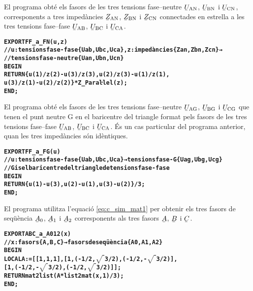El programa  obté els fasors de les tres tensions fase--neutre $\cmplx{U}\ped{AN}$, $\cmplx{U}\ped{BN}$ i $\cmplx{U}\ped{CN}$, corresponents a tres impedàncies $\cmplx{Z}\ped{AN}$, $\cmplx{Z}\ped{BN}$ i $\cmplx{Z}\ped{CN}$ connectades en estrella a  les tres tensions fase--fase
$\cmplx{U}\ped{AB}$, $\cmplx{U}\ped{BC}$ i $\cmplx{U}\ped{CA}$.
\pagebreak
\begin{alltt}
\bfseries
{}
    EXPORT FF_a_FN(u,z)
    // u:tensions fase-fase \{Uab,Ubc,Uca\}, z:impedàncies \{Zan,Zbn,Zcn\} →
    // tensions fase-neutre \{Uan,Ubn,Ucn\}
    BEGIN
      RETURN \{u(1)/z(2)-u(3)/z(3),u(2)/z(3)-u(1)/z(1),
              u(3)/z(1)-u(2)/z(2)\}*Z_Paraŀlel(z);
    END;
\end{alltt}

El programa  obté els fasors de les tres tensions fase--neutre $\cmplx{U}\ped{AG}$, $\cmplx{U}\ped{BG}$ i $\cmplx{U}\ped{CG}$ que tenen el punt neutre G en el baricentre del triangle format pels fasors de  les tres tensions fase--fase
$\cmplx{U}\ped{AB}$, $\cmplx{U}\ped{BC}$ i $\cmplx{U}\ped{CA}$. És un cas particular del programa anterior, quan les tres impedàncies són idèntiques.
\vspace{-1cm}
\begin{alltt}
\bfseries
{}
    EXPORT FF_a_FG(u)
    // u:tensions fase-fase \{Uab,Ubc,Uca\} → tensions fase-G \{Uag,Ubg,Ucg\}
    // G is el baricentre del triangle de tensions fase-fase
    BEGIN
      RETURN \{u(1)-u(3),u(2)-u(1),u(3)-u(2)\}/3;
    END;
\end{alltt}

El programa  utilitza l'equació \eqref{eq:c_sim_mat1} per obtenir els tres fasors de seqüència
$\cmplx{A}_0$, $\cmplx{A}_1$ i  $\cmplx{A}_2$ corresponents als tres fasors $\cmplx{A}$, $\cmplx{B}$ i $\cmplx{C}$.
\vspace{-1cm}
\begin{alltt}
\bfseries
{}
    EXPORT ABC_a_A012(x)
    // x:fasors \{A,B,C\} → fasors de seqüència \{A0,A1,A2\}
    BEGIN
      LOCAL A:=[[1,1,1],[1,(-1/2,\(\sqrt{\phantom{|}}\)3/2),(-1/2,-\(\sqrt{\phantom{|}}\)3/2)],
                [1,(-1/2,-\(\sqrt{\phantom{|}}\)3/2),(-1/2,\(\sqrt{\phantom{|}}\)3/2)]];
      RETURN mat2list(A*list2mat(x,1)/3);
    END;
\end{alltt}

